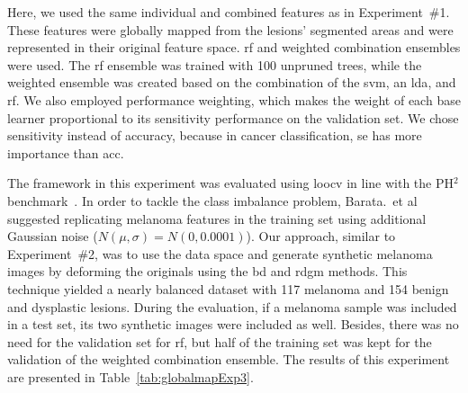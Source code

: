 Here, we used the same individual and combined features as in Experiment~\#1.
These features were globally mapped from the lesions' segmented areas and were represented in their original feature space.
\ac{rf} and weighted combination ensembles were used.
The \ac{rf} ensemble was trained with 100 unpruned trees, while the weighted ensemble was created based on the combination of the \ac{svm}, an \ac{lda}, and \ac{rf}.
We also employed performance weighting, which makes the weight of each base learner proportional to its sensitivity performance on the validation set. 
We chose sensitivity instead of accuracy, because in cancer classification, \ac{se} has more importance than \ac{acc}.

The framework in this experiment was evaluated using \ac{loocv} in line with the PH$^{2}$ benchmark~\cite{barata2013two}.
In order to tackle the class imbalance problem, Barata.~et al\,\cite{barata2013two} suggested replicating melanoma features in the training set using additional Gaussian noise ($N(\mu, \sigma) = N(0, 0.0001)$).
Our approach, similar to Experiment~\#2, was to use the data space and generate synthetic melanoma images by deforming the originals using the \ac{bd} and \ac{rdgm} methods.
This technique yielded a nearly balanced dataset with 117 melanoma and 154 benign and dysplastic lesions.
During the evaluation, if a melanoma sample was included in a test set, its two synthetic images were included as well.
Besides, there was no need for the validation set for \ac{rf}, but half of the training set was kept for the validation of the weighted combination ensemble.
The results of this experiment are presented in Table~\ref{tab:globalmapExp3}.




